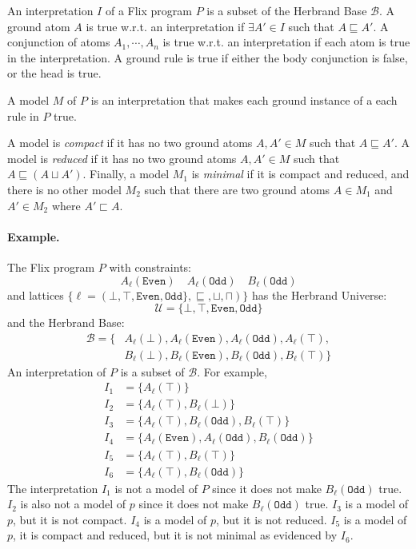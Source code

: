 \documentclass[10pt,twocolumn]{article}
\begin{document}
An interpretation $I$ of a Flix program $P$ is a subset of the Herbrand Base $\mathcal{B}$.
A ground atom $A$ is true w.r.t. an interpretation if $\exists A' \in I$ such that $A \sqsubseteq A'$. 
A conjunction of atoms $A_1, \cdots, A_n$ is true w.r.t. an interpretation if each atom is true in the interpretation.
A ground rule is true if either the body conjunction is false, or the head is true.

A model $M$ of $P$ is an interpretation that makes each ground instance of a each rule in $P$ true.

A model is \emph{compact} if it has no two ground atoms $A, A' \in M$ such that $A \sqsubseteq A'$.
%
A model is \emph{reduced} if it has no two ground atoms $A, A' \in M$ such that $A \sqsubseteq (A \sqcup A')$.
%
Finally, a model $M_1$ is \emph{minimal} if it is compact and reduced, and there is no other model $M_2$ 
such that there are two ground atoms $A \in M_1$ and $A' \in M_2$ where $A' \sqsubset A$.

\paragraph{Example.}
The Flix program $P$ with constraints:
\[
    A_\ell(\texttt{Even}) \quad A_\ell(\texttt{Odd}) \quad B_\ell(\texttt{Odd})
\]
and lattices $\{ \ell = (\bot, \top, \texttt{Even}, \texttt{Odd}\}, \sqsubseteq, \sqcup, \sqcap) \}$ has
the Herbrand Universe:
%
\[
    \mathcal{U} = \{\bot, \top, \texttt{Even}, \texttt{Odd}\}
\]
%
and the Herbrand Base: 
%
\begin{align*}
    \mathcal{B} = \{ & A_\ell(\bot), A_\ell(\texttt{Even}), A_\ell(\texttt{Odd}), A_\ell(\top), \\
                     & B_\ell(\bot), B_\ell(\texttt{Even}), B_\ell(\texttt{Odd}), B_\ell(\top) \}
\end{align*}
%
An interpretation of $P$ is a subset of $\mathcal{B}$.
For example,
%
\begin{align*}
    I_1 & = \{ A_\ell(\top) \} \\
    I_2 & = \{ A_\ell(\top), B_\ell(\bot) \} \\
    I_3 & = \{ A_\ell(\top), B_\ell(\texttt{Odd}), B_\ell(\top) \} \\
    I_4 & = \{ A_\ell(\texttt{Even}), A_\ell(\texttt{Odd}), B_\ell(\texttt{Odd}) \} \\
    I_5 & = \{ A_\ell(\top), B_\ell(\top) \} \\
    I_6 & = \{ A_\ell(\top), B_\ell(\texttt{Odd}) \}
\end{align*}
%
The interpretation 
$I_1$ is not a model of $P$ since it does not make $B_\ell(\texttt{Odd})$ true.
$I_2$ is also not a model of $p$ since it does not make $B_\ell(\texttt{Odd})$ true.
$I_3$ is a model of $p$, but it is not compact.
$I_4$ is a model of $p$, but it is not reduced.
$I_5$ is a model of $p$, it is compact and reduced, but it is not minimal as evidenced by $I_6$.
\end{document}
